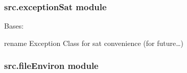 \documentclass[a4paper,10pt,english]{sphinxmanual}
\begin{document}

\begin{fulllineitems}
\label{\detokenize{apidoc_src/src:src.environs.print_split_pattern_environs}}
\end{fulllineitems}



\subsubsection{src.exceptionSat module}
\label{\detokenize{apidoc_src/src:module-src.exceptionSat}}\label{\detokenize{apidoc_src/src:src-exceptionsat-module}}

\begin{fulllineitems}
\label{\detokenize{apidoc_src/src:src.exceptionSat.ExceptionSat}}
Bases: 

rename Exception Class for sat convenience (for future…)

\end{fulllineitems}



\subsubsection{src.fileEnviron module}
\label{\detokenize{apidoc_src/src:src-fileenviron-module}}\label{\detokenize{apidoc_src/src:module-src.fileEnviron}}
\end{document}
